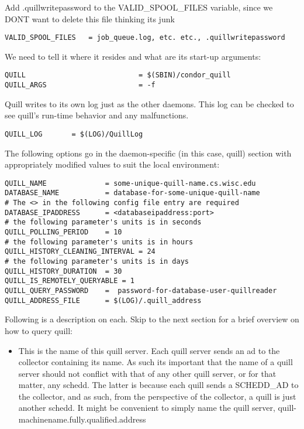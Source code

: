 \begin{enumerate}
Add .quillwritepassword to the VALID\_SPOOL\_FILES variable, since we 
DONT want  to delete this file thinking its junk
\begin{verbatim}
VALID_SPOOL_FILES	= job_queue.log, etc. etc., .quillwritepassword
\end{verbatim}

We need to tell it where it resides and what are its start-up arguments:
\begin{verbatim}
QUILL                           = $(SBIN)/condor_quill
QUILL_ARGS                      = -f
\end{verbatim}

Quill writes to its own log just as the other daemons.  This log can be 
checked to see quill's run-time behavior and any malfunctions.
\begin{verbatim}
QUILL_LOG       = $(LOG)/QuillLog
\end{verbatim}

The following options go in the daemon-specific (in this case, quill) 
section with appropriately modified values to suit the local environment:

\begin{verbatim}
QUILL_NAME              = some-unique-quill-name.cs.wisc.edu
DATABASE_NAME           = database-for-some-unique-quill-name
# The <> in the following config file entry are required
DATABASE_IPADDRESS      = <databaseipaddress:port>
# the following parameter's units is in seconds
QUILL_POLLING_PERIOD    = 10
# the following parameter's units is in hours
QUILL_HISTORY_CLEANING_INTERVAL = 24
# the following parameter's units is in days
QUILL_HISTORY_DURATION 	= 30
QUILL_IS_REMOTELY_QUERYABLE = 1
QUILL_QUERY_PASSWORD 	=  password-for-database-user-quillreader
QUILL_ADDRESS_FILE      = $(LOG)/.quill_address
\end{verbatim}

Following is a description on each.  Skip to the next section for a brief 
overview on how to query quill:

\begin{itemize}
\item {}
This is the name of this quill server.  Each quill server sends an ad to
the collector containing its name.  As such its important that the name of
a quill server should not conflict with that of any other quill server,
or for that matter, any schedd.  The latter is because each quill sends
a SCHEDD\_AD to the collector, and as such, from the perspective of the
collector, a quill is just another schedd. It might be convenient to
simply name the quill server, quill-machinename.fully.qualified.address


\end{itemize}
\end{enumerate}
